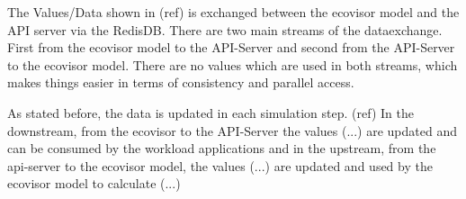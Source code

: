 The Values/Data shown in (ref) is exchanged between the ecovisor model and the API server via the RedisDB. There are two main streams of the dataexchange.
First from the ecovisor model to the API-Server and second from the API-Server to the ecovisor model. There are no values which are used in both streams, which makes things
easier in terms of consistency and parallel access. 

As stated before, the data is updated in each simulation step. (ref) 
In the downstream, from the ecovisor to the API-Server the values (...) are updated and can be consumed by the workload applications
and in the upstream, from the api-server to the ecovisor model, the values (...) are updated and used by the ecovisor model to calculate (...) %

